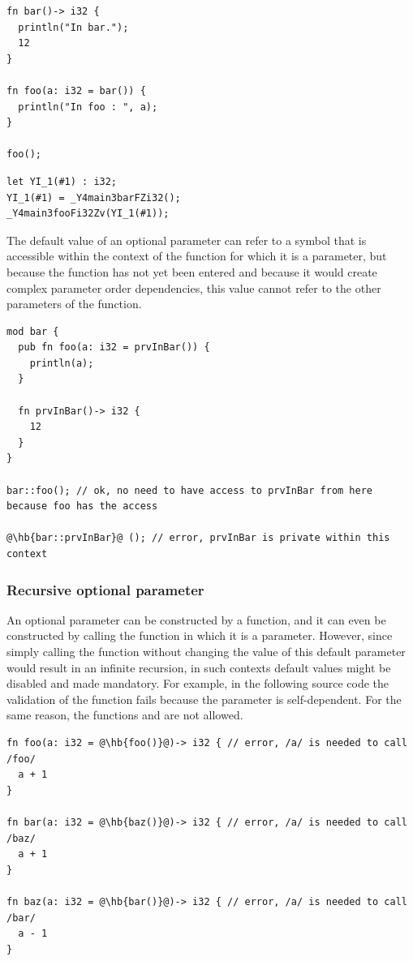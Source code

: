 \begin{lstlisting}[style=coloredverbatim]
fn bar()-> i32 {
  println("In bar.");
  12
}

fn foo(a: i32 = bar()) {
  println("In foo : ", a);
}

foo();
\end{lstlisting}

\begin{lstlisting}[style=lyilVerb]
let YI_1(#1) : i32;
YI_1(#1) = _Y4main3barFZi32();
_Y4main3fooFi32Zv(YI_1(#1));
\end{lstlisting}

The default value of an optional parameter can refer to a symbol that is
accessible within the context of the function for which it is a parameter, but
because the function has not yet been entered and because it would create
complex parameter order dependencies, this value cannot refer to the other
parameters of the function.

\begin{lstlisting}[style=coloredverbatimError, escapechar=@]
mod bar {
  pub fn foo(a: i32 = prvInBar()) {
    println(a);
  }

  fn prvInBar()-> i32 {
    12
  }
}

bar::foo(); // ok, no need to have access to prvInBar from here because foo has the access

@\hb{bar::prvInBar}@ (); // error, prvInBar is private within this context
\end{lstlisting}

\subsubsection*{Recursive optional parameter}

An optional parameter can be constructed by a function, and it can even be
constructed by calling the function in which it is a parameter. However, since
simply calling the function without changing the value of this default parameter
would result in an infinite recursion, in such contexts default values might be
disabled and made mandatory. For example, in the following source code the
validation of the function  fails because the parameter 
is self-dependent. For the same reason, the functions  and
 are not allowed.

\begin{lstlisting}[style=coloredverbatimError, escapechar=@]
fn foo(a: i32 = @\hb{foo()}@)-> i32 { // error, /a/ is needed to call /foo/
  a + 1
}

fn bar(a: i32 = @\hb{baz()}@)-> i32 { // error, /a/ is needed to call /baz/
  a + 1
}

fn baz(a: i32 = @\hb{bar()}@)-> i32 { // error, /a/ is needed to call /bar/
  a - 1
}
\end{lstlisting}

